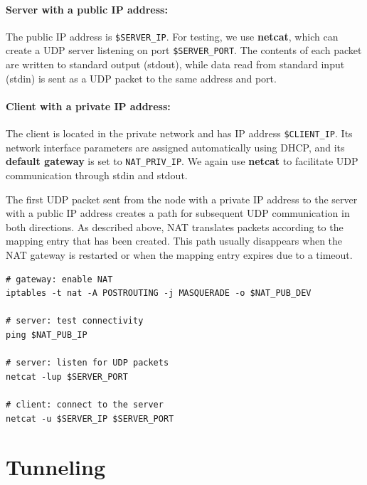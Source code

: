 \paragraph*{Server with a public IP address:}
The public IP address is \verb|$SERVER_IP|. For testing, we use \textbf{netcat}, which can create a UDP server listening on port \verb|$SERVER_PORT|. The contents of each packet are written to standard output (stdout), while data read from standard input (stdin) is sent as a UDP packet to the same address and port.

\paragraph*{Client with a private IP address:}
The client is located in the private network and has IP address \verb|$CLIENT_IP|. Its network interface parameters are assigned automatically using DHCP, and its \textbf{default gateway} is set to \verb|NAT_PRIV_IP|. We again use \textbf{netcat} to facilitate UDP communication through stdin and stdout.

\bigskip
The first UDP packet sent from the node with a private IP address to the server with a public IP address creates a path for subsequent UDP communication in both directions. As described above, NAT translates packets according to the mapping entry that has been created.
This path usually disappears when the NAT gateway is restarted or when the mapping entry expires due to a timeout.

\begin{verbatim}
# gateway: enable NAT
iptables -t nat -A POSTROUTING -j MASQUERADE -o $NAT_PUB_DEV

# server: test connectivity
ping $NAT_PUB_IP

# server: listen for UDP packets
netcat -lup $SERVER_PORT

# client: connect to the server
netcat -u $SERVER_IP $SERVER_PORT
\end{verbatim}

\section{Tunneling}

